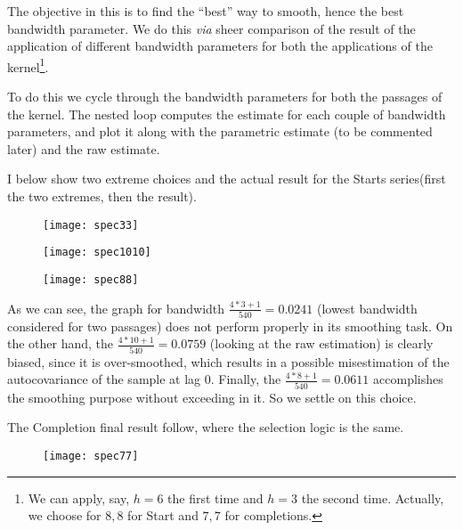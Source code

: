 \documentclass[12pt]{article} %
\begin{document}
The objective in this is to find the ``best'' way to smooth, hence the best bandwidth parameter. We do this {\em via} sheer comparison of the result of the application of different bandwidth parameters for both the applications of the kernel\footnote{We can apply, say, $h=6$ the first time and $h=3$ the second time. Actually, we choose for $8,8$ for Start and $7,7$ for completions.}.

To do this we cycle through the bandwidth parameters for both the passages of the kernel. The nested loop computes the estimate for each couple of bandwidth parameters, and plot it along with the parametric estimate (to be commented later) and the raw estimate. 

I below show two extreme choices and the actual result for the Starts series(first the two extremes, then the result).

\begin{figure}[h!]
\begin{center}
\texttt{[image: spec33]}
\caption{}
\end{center}
\end{figure}

\begin{figure}[h!]
\begin{center}
\texttt{[image: spec1010]}
\caption{}
\end{center}
\end{figure}

\begin{figure}[h!]
\begin{center}
\texttt{[image: spec88]}
\caption{}
\end{center}
\end{figure}

As we can see, the graph for bandwidth $\frac{4*3+1}{540}=0.0241$ (lowest bandwidth considered for two passages) does not perform properly in its smoothing task. On the other hand, the $\frac{4*10+1}{540}=0.0759$ (looking at the raw estimation) is clearly biased, since it is over-smoothed, which results in a possible misestimation of the autocovariance of the sample at lag 0. Finally, the $\frac{4*8+1}{540}=0.0611$ accomplishes the smoothing purpose without exceeding in it. So we settle on this choice.

The Completion final result follow, where the selection logic is the same.
 
\begin{figure}[H]
\begin{center}
\texttt{[image: spec77]}
\caption{}
\end{center}
\end{figure}
\end{document}

